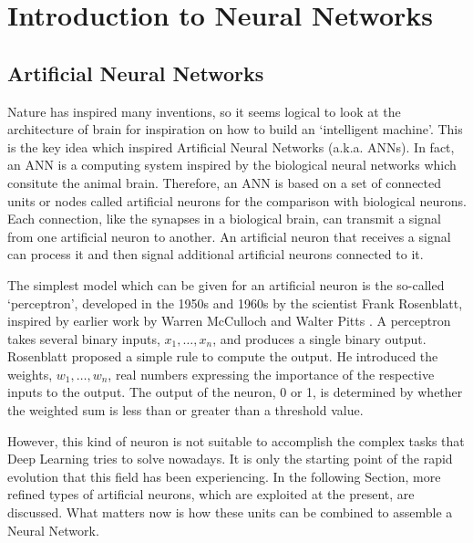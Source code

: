 \chapter{Introduction to Neural Networks}
\label{chap:NN}





\section{Artificial Neural Networks}
Nature has inspired many inventions, so it seems logical to look at the architecture of brain for inspiration on how to build an `intelligent machine'. This is the key idea which inspired Artificial Neural Networks (a.k.a. ANNs). In fact, an ANN is a computing system inspired by the biological neural networks which consitute the animal brain. Therefore, an ANN is based on a set of connected units or nodes called artificial neurons for the comparison with biological neurons. Each connection, like the synapses in a biological brain, can transmit a signal from one artificial neuron to another. An artificial neuron that receives a signal can process it and then signal additional artificial neurons connected to it.

The simplest model which can be given for an artificial neuron is the so-called `perceptron', developed in the 1950s and 1960s by the scientist Frank Rosenblatt, inspired by earlier work by Warren McCulloch and Walter Pitts \cite{nielsen}. A perceptron takes several binary inputs, $x_{1}, \dots, x_{n}$, and produces a single binary output. Rosenblatt proposed a simple rule to compute the output. He introduced the weights, $w_{1}, \dots, w_{n}$, real numbers expressing the importance of the respective inputs to the output. The output of the neuron, 0 or 1, is determined by whether the weighted sum is less than or greater than a threshold value.

\begin{figure}[H]
	\centering
	
	\label{fig:PERCEPTRON}
\end{figure}

However, this kind of neuron is not suitable to accomplish the complex tasks that Deep Learning tries to solve nowadays. It is only the starting point of the rapid evolution that this field has been experiencing. In the following Section, more refined types of artificial neurons, which are exploited at the present, are discussed. What matters now is how these units can be combined to assemble a Neural Network.

